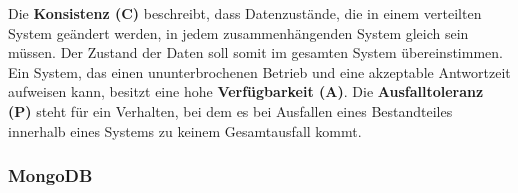 Die \textbf{Konsistenz (C)} beschreibt, dass Datenzustände, die in einem verteilten System geändert  werden, in jedem zusammenhängenden System gleich sein müssen. Der Zustand der Daten soll somit im gesamten System übereinstimmen. Ein System, das einen ununterbrochenen Betrieb und eine akzeptable Antwortzeit aufweisen kann, besitzt eine hohe \textbf{Verfügbarkeit (A)}. Die \textbf{Ausfalltoleranz (P)} steht für ein Verhalten, bei dem es bei Ausfallen eines Bestandteiles innerhalb eines Systems  zu keinem Gesamtausfall kommt.

\newpage
\subsubsection{MongoDB}

